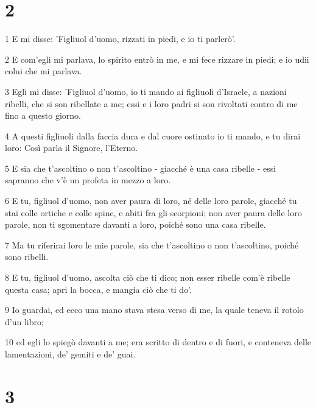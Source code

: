 \chapter{2}

\par 1 E mi disse: 'Figliuol d'uomo, rizzati in piedi, e io ti parlerò'.
\par 2 E com'egli mi parlava, lo spirito entrò in me, e mi fece rizzare in piedi; e io udii colui che mi parlava.
\par 3 Egli mi disse: 'Figliuol d'uomo, io ti mando ai figliuoli d'Israele, a nazioni ribelli, che si son ribellate a me; essi e i loro padri si son rivoltati contro di me fino a questo giorno.
\par 4 A questi figliuoli dalla faccia dura e dal cuore ostinato io ti mando, e tu dirai loro: Così parla il Signore, l'Eterno.
\par 5 E sia che t'ascoltino o non t'ascoltino - giacché è una casa ribelle - essi sapranno che v'è un profeta in mezzo a loro.
\par 6 E tu, figliuol d'uomo, non aver paura di loro, né delle loro parole, giacché tu stai colle ortiche e colle spine, e abiti fra gli scorpioni; non aver paura delle loro parole, non ti sgomentare davanti a loro, poiché sono una casa ribelle.
\par 7 Ma tu riferirai loro le mie parole, sia che t'ascoltino o non t'ascoltino, poiché sono ribelli.
\par 8 E tu, figliuol d'uomo, ascolta ciò che ti dico; non esser ribelle com'è ribelle questa casa; apri la bocca, e mangia ciò che ti do'.
\par 9 Io guardai, ed ecco una mano stava stesa verso di me, la quale teneva il rotolo d'un libro;
\par 10 ed egli lo spiegò davanti a me; era scritto di dentro e di fuori, e conteneva delle lamentazioni, de' gemiti e de' guai.

\chapter{3}

